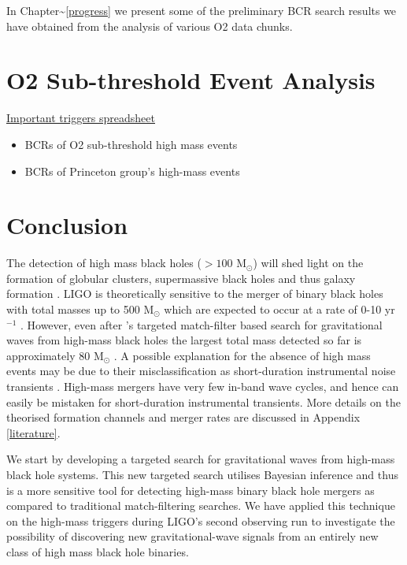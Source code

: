 \documentclass[%
 reprint,
 amsmath,amssymb,
 aps,
]{revtex4-2}
\begin{document}
In Chapter\textasciitilde\ref{progress} we present some of the preliminary BCR search results we
have obtained from the analysis of various O2 data chunks.




\section{\label{sec:Analysis}O2 Sub-threshold Event Analysis}
\hyperlink{https://docs.google.com/spreadsheets/d/1hm7lFsYneY8NGbFDr-vH5YYsILrxcTexO9D1AvF1qJo/edit?usp=sharing}{Important triggers spreadsheet}
\begin{itemize}
    \item BCRs of O2 sub-threshold high mass events
    \item BCRs of Princeton group's high-mass  events
\end{itemize}


\section{\label{sec:Conclusion}Conclusion}
The detection of high mass black holes (\(>100\) M\({}_\odot\)) will shed light on the formation of globular clusters,
supermassive black holes and thus galaxy formation \citep{lodato2006supermassive, 2018IMBHreview}. LIGO is theoretically
sensitive to the merger of binary black holes with total masses up to 500 M\({}_\odot\) which are expected to occur at a
rate of 0-10 yr\(^{-1}\) \citep[\citet{mandel2008rates}]{fregeau2006imbhbRatePrediction}. However, even after \citet{salemi2019search}'s
targeted match-filter based search for gravitational waves from high-mass black holes the largest total mass detected so
far is approximately 80 M\({}_\odot\) \citep{abbott2019gwtc}. A possible explanation for the absence of high mass events may be
due to their misclassification as short-duration instrumental noise transients \citep{blipGlitches}. High-mass mergers have
very few in-band wave cycles, and hence can easily be mistaken for short-duration instrumental transients. More details
on the theorised formation channels and merger rates are discussed in Appendix \ref{literature}.

We start by developing a targeted search for gravitational waves from high-mass black hole systems. This new targeted
search utilises Bayesian inference and thus is a more sensitive tool for detecting high-mass binary black hole mergers
as compared to traditional match-filtering searches. We have applied this technique on the high-mass triggers during
LIGO's second observing run to investigate the possibility of discovering new gravitational-wave signals from an
entirely new class of high mass black hole binaries.
\end{document}
